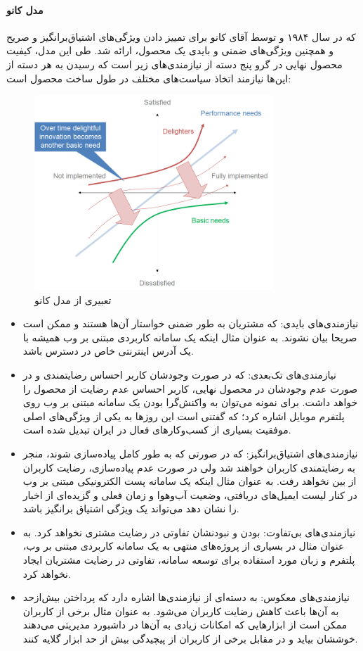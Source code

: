 \paragraph{مدل کانو}
که در سال ۱۹۸۴ و توسط آقای کانو
\cite{kano_attractive_1984}
برای تمییز دادن ویژگی‌های اشتیاق‌برانگیز و صریح و همچنین ویژگی‌های ضمنی و بایدی یک محصول، ارائه شد. طی این مدل، کیفیت محصول نهایی در گرو پنج دسته از نیازمندی‌های زیر است که رسیدن به هر دسته از این‌ها نیازمند اتخاذ سیاست‌های مختلف در طول ساخت محصول است:
\begin{figure}[H]
	\centering
	\includegraphics[width=9cm]{Resources/kano_model.PNG}
	\caption[تعبیری از مدل کانو]	{
		تعبیری از مدل کانو
		\cite{noauthor_kano_2018}
	}
	\label{fig:kano}
\end{figure}
\begin{itemize}
	\item 
	نیازمندی‌های بایدی: که مشتریان به طور ضمنی خواستار آن‌ها هستند و ممکن است صریحا بیان نشوند. به عنوان مثال اینکه یک سامانه کاربردی مبتنی بر وب همیشه با یک آدرس اینترنتی خاص
	در دسترس باشد.
	\item
	نیازمندی‌های تک‌بعدی: که در صورت وجودشان کاربر احساس رضایتمندی و در صورت عدم وجودشان در محصول نهایی، کاربر احساس عدم رضایت از محصول را خواهد داشت. برای نمونه می‌توان به واکنش‌گرا بودن یک سامانه مبتنی بر وب روی پلتفرم موبایل اشاره کرد؛ که گفتنی است این روزها به یکی از ویژگی‌های اصلی موفقیت بسیاری از کسب‌وکارهای فعال در ایران تبدیل شده است.
	\item 
	نیازمندی‌های اشتیاق‌برانگیز: که در صورتی که به طور کامل پیاده‌سازی شوند، منجر به رضایتمندی کاربران خواهند شد ولی در صورت عدم پیاده‌سازی، رضایت کاربران از بین نخواهد رفت. به عنوان مثال اینکه یک سامانه پست الکترونیکی مبتنی بر وب در کنار لیست ایمیل‌های دریافتی، وضعیت آب‌وهوا و زمان فعلی و گزیده‌ای از اخبار را نشان دهد می‌تواند یک ویژگی اشتیاق برانگیز باشد.
	\item 
	نیازمندی‌های بی‌تفاوت: بودن و نبودنشان تفاوتی در رضایت مشتری نخواهد کرد. به عنوان مثال در بسیاری از پروژه‌های منتهی به یک سامانه کاربردی مبتنی بر وب، پلتفرم و زبان مورد استفاده برای توسعه سامانه، تفاوتی در رضایت مشتریان ایجاد نخواهد کرد.
	\item 
	نیازمندی‌های معکوس: به دسته‌ای از نیازمندی‌ها اشاره دارد که پرداختن بیش‌ازحد به آن‌ها باعث کاهش رضایت کاربران می‌شود. به عنوان مثال برخی از کاربران ممکن است از ابزارهایی که امکانات زیادی به آن‌ها در داشبورد مدیریتی می‌دهند خوششان بیاید و در مقابل برخی از کاربران از پیچیدگی بیش از حد ابزار گلایه کنند.
\end{itemize}
